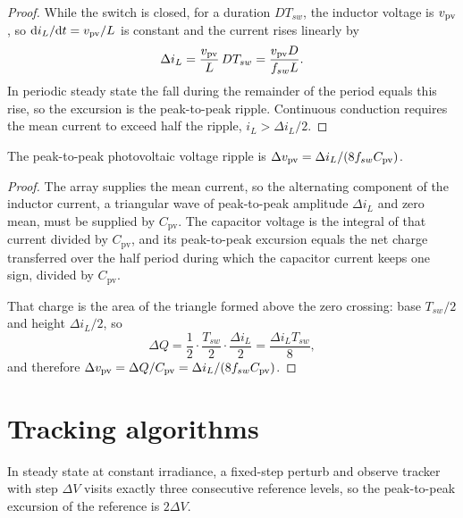 \begin{proof}
While the switch is closed, for a duration $D T_{sw}$, the inductor voltage is
$v_{\mathrm{pv}}$, so $\mathrm{d}i_L/\mathrm{d}t = v_{\mathrm{pv}}/L$ is constant and the current rises
linearly by
\[
\Delta i_L = \frac{v_{\mathrm{pv}}}{L}\, D T_{sw} = \frac{v_{\mathrm{pv}} D}{f_{sw} L} .
\]
In periodic steady state the fall during the remainder of the period equals this
rise, so the excursion is the peak-to-peak ripple. Continuous conduction
requires the mean current to exceed half the ripple, $i_L > \Delta i_L/2$.
\end{proof}

\begin{proposition}
\label{prop:vripple}
The peak-to-peak photovoltaic voltage ripple is
$\Delta v_{\mathrm{pv}} = \Delta i_L/(8 f_{sw} C_{\mathrm{pv}})$.
\end{proposition}

\begin{proof}
The array supplies the mean current, so the alternating component of the
inductor current, a triangular wave of peak-to-peak amplitude $\Delta i_L$ and
zero mean, must be supplied by $C_{\mathrm{pv}}$. The capacitor voltage is the
integral of that current divided by $C_{\mathrm{pv}}$, and its peak-to-peak
excursion equals the net charge transferred over the half period during which
the capacitor current keeps one sign, divided by $C_{\mathrm{pv}}$.

That charge is the area of the triangle formed above the zero crossing: base
$T_{sw}/2$ and height $\Delta i_L/2$, so
\[
\Delta Q = \frac{1}{2}\cdot\frac{T_{sw}}{2}\cdot\frac{\Delta i_L}{2} = \frac{\Delta i_L T_{sw}}{8},
\]
and therefore
$\Delta v_{\mathrm{pv}} = \Delta Q / C_{\mathrm{pv}} = \Delta i_L/(8 f_{sw} C_{\mathrm{pv}})$.
\end{proof}

\section{Tracking algorithms}

\begin{proposition}
\label{prop:limitcycle}
In steady state at constant irradiance, a fixed-step perturb and observe tracker
with step $\Delta V$ visits exactly three consecutive reference levels, so the
peak-to-peak excursion of the reference is $2\Delta V$.
\end{proposition}

